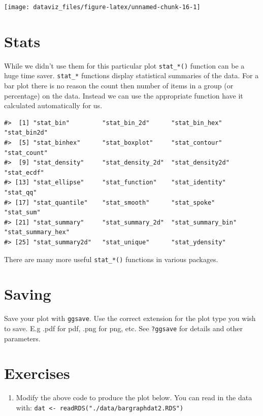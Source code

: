 \documentclass[]{book}
\providecommand{\tightlist}{%
  \setlength{\itemsep}{0pt}\setlength{\parskip}{0pt}}
\theoremstyle{definition}
\theoremstyle{definition}
\theoremstyle{definition}
\theoremstyle{remark}
\begin{document}
\begin{center}\texttt{[image: dataviz\_files/figure-latex/unnamed-chunk-16-1]} \end{center}

\hypertarget{stats}{%
\section{Stats}\label{stats}}

While we didn't use them for this particular plot \texttt{stat\_*()}
function can be a huge time saver. \texttt{stat\_*} functions display
statistical summaries of the data. For a bar plot there is no reason the
count then number of items in a group (or percentage) on the data.
Instead we can use the appropriate function have it calculated
automatically for us.

\begin{verbatim}
#>  [1] "stat_bin"         "stat_bin_2d"      "stat_bin_hex"     "stat_bin2d"      
#>  [5] "stat_binhex"      "stat_boxplot"     "stat_contour"     "stat_count"      
#>  [9] "stat_density"     "stat_density_2d"  "stat_density2d"   "stat_ecdf"       
#> [13] "stat_ellipse"     "stat_function"    "stat_identity"    "stat_qq"         
#> [17] "stat_quantile"    "stat_smooth"      "stat_spoke"       "stat_sum"        
#> [21] "stat_summary"     "stat_summary_2d"  "stat_summary_bin" "stat_summary_hex"
#> [25] "stat_summary2d"   "stat_unique"      "stat_ydensity"
\end{verbatim}

There are many more useful \texttt{stat\_*()} functions in various
packages.

\hypertarget{saving}{%
\section{Saving}\label{saving}}

Save your plot with \texttt{ggsave}. Use the correct extension for the
plot type you wish to save. E.g .pdf for pdf, .png for png, etc. See
\texttt{?ggsave} for details and other parameters.

\hypertarget{exercises-3}{%
\section{Exercises}\label{exercises-3}}

\begin{enumerate}
\def\labelenumi{\arabic{enumi}.}
\tightlist
\item
  Modify the above code to produce the plot below. You can read in the
  data with:
  \texttt{dat\ \textless{}-\ readRDS("./data/bargraphdat2.RDS")}
\end{enumerate}
\end{document}
